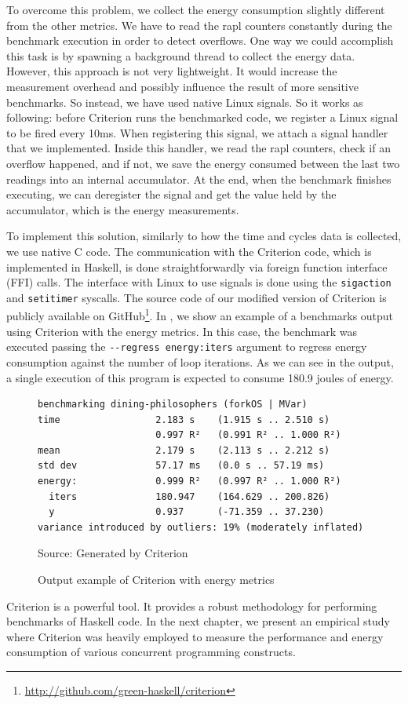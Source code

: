To overcome this problem, we collect the energy consumption slightly different from the other metrics. We have to read the \ac{rapl} counters constantly during the benchmark execution in order to detect overflows. One way we could accomplish this task is by spawning a background thread to collect the energy data. However, this approach is not very lightweight. It would increase the measurement overhead and possibly influence the result of more sensitive benchmarks. So instead, we have used native Linux signals. So it works as following: before Criterion runs the benchmarked code, we register a Linux signal to be fired every 10ms. When registering this signal, we attach a signal handler that we implemented. Inside this handler, we read the \ac{rapl} counters, check if an overflow happened, and if not, we save the energy consumed between the last two readings into an internal accumulator. At the end, when the benchmark finishes executing, we can deregister the signal and get the value held by the accumulator, which is the energy measurements.

To implement this solution, similarly to how the time and cycles data is collected, we use native C code. The communication with the Criterion code, which is implemented in Haskell, is done straightforwardly via foreign function interface (FFI) calls. The interface with Linux to use signals is done using the \texttt{sigaction} and \texttt{setitimer} syscalls. The source code of our modified version of Criterion is publicly available on GitHub\footnote{\url{http://github.com/green-haskell/criterion}}. In , we show an example of a benchmarks output using Criterion with the energy metrics. In this case, the benchmark was executed passing the \texttt{-{}-regress energy:iters} argument to regress energy consumption against the number of loop iterations. As we can see in the output, a single execution of this program is expected to consume 180.9 joules of energy.

\begin{figure}[htp]
  \centering
  \caption{Output example of Criterion with energy metrics}
	\begin{verbatim}
benchmarking dining-philosophers (forkOS | MVar)
time                 2.183 s    (1.915 s .. 2.510 s)
                     0.997 R²   (0.991 R² .. 1.000 R²)
mean                 2.179 s    (2.113 s .. 2.212 s)
std dev              57.17 ms   (0.0 s .. 57.19 ms)
energy:              0.999 R²   (0.997 R² .. 1.000 R²)
  iters              180.947    (164.629 .. 200.826)
  y                  0.937      (-71.359 .. 37.230)
variance introduced by outliers: 19% (moderately inflated)
  \end{verbatim}
  \footnotesize{Source: Generated by Criterion}
  \label{fig:fib-energy-output}
\end{figure}

Criterion is a powerful tool. It provides a robust methodology for performing benchmarks of Haskell code. In the next chapter, we present an empirical study where Criterion was heavily employed to measure the performance and energy consumption of various concurrent programming constructs.
